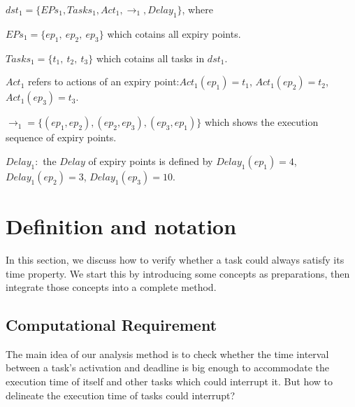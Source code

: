 \documentclass[10pt,conference]{IEEEtran}
\begin{document}
$dst_1=\{EPs_1,Tasks_1,Act_1,\rightarrow_1,Delay_1\}$, where 
\begin{compactitem}
\item $EPs_1=\{ep_1,\ ep_2,\ ep_3\}$ which cotains all expiry points.
\item $Tasks_1=\{t_1,\ t_2,\ t_3\}$ which cotains all tasks in $dst_1$.
\item $Act_1$ refers to actions of an expiry point:$Act_1(ep_1)=t_1$, $Act_1(ep_2)=t_2$, $Act_1(ep_3)=t_3$.
\item $\rightarrow_1=\{(ep_1,ep_2),(ep_2,ep_3),(ep_3,ep_1)\}$ which shows the execution sequence of expiry points.
\item $Delay_1:$ the $Delay$ of expiry points is defined by $Delay_1(ep_1)=4$, $Delay_1(ep_2)=3$, $Delay_1(ep_3)=10$.
\end{compactitem}


\section{Definition and notation}\label{section_definition}
In this section, we discuss how to verify whether a task could always satisfy its time property. We start this by introducing some concepts as preparations, then integrate those concepts into a complete method.

\subsection{Computational Requirement}
The main idea of our analysis method is to check whether the time interval between a task's activation and deadline is big enough to accommodate the execution time of itself and other tasks which could interrupt it. But how to delineate the execution time of tasks could interrupt?
\end{document}
